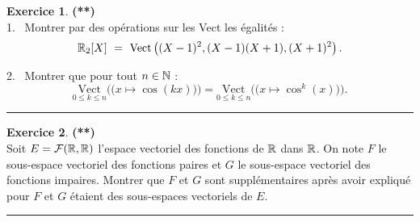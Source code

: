 \documentclass[a4paper,11pt]{article}
\theoremstyle{definition}
\newtheorem{exo}{Exercice} %
\begin{document}
	


\begin{exo}\textbf{(**)}\quad\\[0.25cm]%
1. \ Montrer par des opérations sur les Vect les égalités :\\[-0.5cm]

$$\mathbb{R}_2 [X ] \ = \  \text{Vect}\left((X - 1)^2 , (X - 1)(X + 1), (X + 1)^2\right)  .$$

2. \ Montrer que pour tout $n \in \mathbb{N}$ :
$$\underset{0\leq k\leq n}{\text{Vect}}\Big(\big(x\mapsto \cos(kx)\big)\Big)= \underset{0\leq k\leq n}{\text{Vect}}\Big(\big(x\mapsto \cos^k(x)\big)\Big).$$

	\centering
\rule{1\linewidth}{0.6pt}
\end{exo}

\begin{exo}\textbf{(**)}\quad\\[0.25cm]%
	Soit $E=\mathcal F(\mathbb{R},\mathbb{R})$ l'espace vectoriel des fonctions de $\mathbb{R}$ dans $\mathbb{R}$. On note $F$ le sous-espace vectoriel des fonctions paires et $G$ le sous-espace vectoriel des fonctions impaires. Montrer que $F$ et $G$ sont supplémentaires après avoir expliqué pour $F$ et $G$ étaient des sous-espaces vectoriels de $E$.
	
	\centering
	\rule{1\linewidth}{0.6pt}
\end{exo}


\newpage
\end{document}
